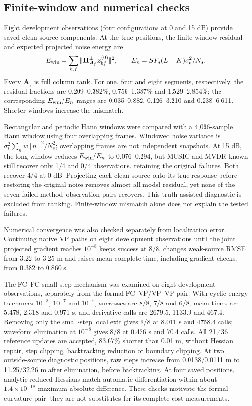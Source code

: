 \documentclass[a4paper,fleqn,review]{cas-sc}
\begin{document}
\FloatBarrier
\subsection{Finite-window and numerical checks}
\label{en:windowcheck}
Eight development observations (four configurations at 0 and 15 dB) provide saved clean source components. At the true positions, the finite-window residual and expected projected noise energy are
\begin{equation}
E_{\rm win}=\sum_{b,f}\|\bm\Pi_{\bm A_f}^{\perp}\bm z_{bf}^{(0)}\|^2,
\qquad E_n=SF_s(L-K)\sigma_t^2/N_s.
\end{equation}
Every $\bm A_f$ is full column rank. For one, four and eight segments, respectively, the residual fractions are 0.209--0.382\%, 0.756--1.387\% and 1.529--2.854\%; the corresponding $E_{\rm win}/E_n$ ranges are 0.035--0.882, 0.126--3.210 and 0.238--6.611. Shorter windows increase the mismatch.

Rectangular and periodic Hann windows were compared with a 4,096-sample Hann window using four overlapping frames. Windowed noise variance is $\sigma_t^2\sum_n w[n]^2/N_s^2$; overlapping frames are not independent snapshots. At 15 dB, the long window reduces $E_{\rm win}/E_n$ to 0.076--0.294, but MUSIC and MVDR-known still recover only 1/4 and 0/4 observations, retaining the original failures. Both recover 4/4 at 0 dB. Projecting each clean source onto its true response before restoring the original noise removes almost all model residual, yet none of the seven failed method--observation pairs recovers. This truth-assisted diagnostic is excluded from ranking. Finite-window mismatch alone does not explain the tested failures.

\label{en:localchecks}
Numerical convergence was also checked separately from localization error. Continuing native VP paths on eight development observations until the joint projected gradient reaches $10^{-8}$ keeps success at 8/8, changes weak-source RMSE from 3.22 to 3.25 m and raises mean complete time, including gradient checks, from 0.382 to 0.860 s.

The FC--FC small-step mechanism was examined on eight development observations, separately from the formal FC--VP/VP--VP pair. With cyclic energy tolerances $10^{-8}$, $10^{-7}$ and $10^{-6}$, successes are 8/8, 7/8 and 6/8; mean times are 5.478, 2.318 and 0.971 s, and derivative calls are 2679.5, 1133.9 and 467.4. Removing only the small-step local exit gives 8/8 at 8.011 s and 4758.4 calls; waveform elimination at $10^{-8}$ gives 8/8 at 0.436 s and 70.4 calls. All 21,436 reference updates are accepted, 83.67\% shorter than 0.01 m, without Hessian repair, step clipping, backtracking reduction or boundary clipping. At two outside-source diagnostic positions, raw steps increase from 0.0138/0.0111 m to 11.25/32.26 m after elimination, before backtracking. At four saved positions, analytic reduced Hessians match automatic differentiation within about $1.4\times10^{-18}$ maximum absolute difference. These checks motivate the formal curvature pair; they are not substitutes for its complete cost measurements.
\end{document}
